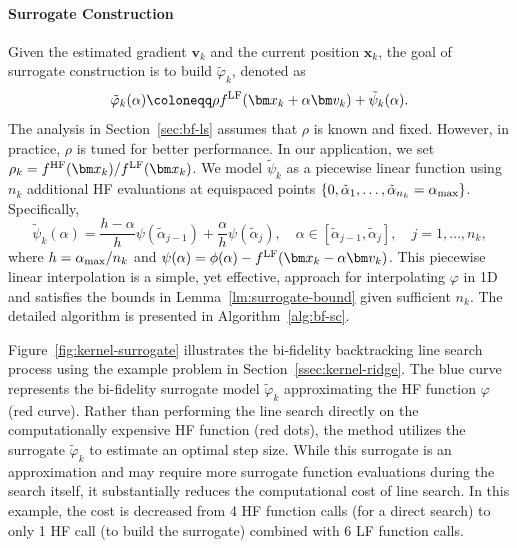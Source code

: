 \documentclass[10pt]{article} %
\numberwithin{equation}{section}
\theoremstyle{plain}
\theoremstyle{definition}
\newcommand{\<}{\langle}
\renewcommand{\>}{\rangle}
\renewcommand{\(}{\left(}
\renewcommand{\)}{\right)}
\renewcommand{\[}{\left[}
\renewcommand{\]}{\right]}
\newcommand{\HF}{\textup{HF}}
\newcommand{\LF}{\textup{LF}}
\newcommand{\alphaMax}{\alpha_\textup{max}}
\newcommand{\interceptSurrogate}{\tilde{\psi}_k}
\newcommand{\HFSurrogate}{\tilde{\varphi}_k}
\begin{document}
\paragraph{Surrogate Construction}
Given the estimated gradient $\bm v_k$ and the current position $\bm x_k$, the goal of surrogate construction is to build $\tilde{\varphi}_k$, denoted as
\begin{equation}
\label{eq:varphi-def}
\HFSurrogate(\alpha) \coloneqq \rho f^\LF(\bm x_k + \alpha \bm v_k) + \interceptSurrogate(\alpha).
\end{equation}
The analysis in Section~\ref{sec:bf-ls} assumes that $\rho$ is known and fixed. However, in practice, $\rho$ is tuned for better performance. In our application, we set $\rho_k = f^\HF(\bm x_k)/f^\LF(\bm x_k)$. We model $\interceptSurrogate$ as a piecewise linear function using $n_k$ additional HF evaluations at equispaced points $\{0, \tilde{\alpha}_1, \dots, \tilde{\alpha}_{n_k}=\alphaMax\}$. Specifically,
\begin{equation}
\label{eq:piecewise-def}
\interceptSurrogate(\alpha) = \frac{h - \alpha}{h}\psi(\tilde{\alpha}_{j-1}) + \frac{\alpha}{h}\psi(\tilde{\alpha}_j), \quad \alpha \in [\tilde{\alpha}_{j-1}, \tilde{\alpha}_j], \quad j = 1, \dots, n_k,
\end{equation}
where $h = \alphaMax / n_k$ and $\psi(\alpha)=\phi(\alpha) - f^\LF(\bm x_k - \alpha\bm v_k)$. This piecewise linear interpolation is a simple, yet effective, approach for interpolating $\varphi$ in 1D and satisfies the bounds in Lemma~\ref{lm:surrogate-bound} given sufficient $n_k$. The detailed algorithm is presented in Algorithm~\ref{alg:bf-sc}. 

Figure~\ref{fig:kernel-surrogate} illustrates the bi-fidelity backtracking line search process using the example problem in Section~\ref{ssec:kernel-ridge}. The blue curve represents the bi-fidelity surrogate model $\tilde{\varphi}_k$ approximating the HF function $\varphi$ (red curve). Rather than performing the line search directly on the computationally expensive HF function (red dots), the method utilizes the surrogate $\tilde{\varphi}_k$ to estimate an optimal step size. While this surrogate is an approximation and may require more surrogate function evaluations during the search itself, it substantially reduces the computational cost of line search. In this example, the cost is decreased from 4 HF function calls (for a direct search) to only 1 HF call (to build the surrogate) combined with 6 LF function calls.
\end{document}

